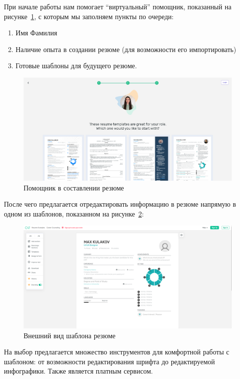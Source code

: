 \documentclass[master, och, pract]{SCWorks}
\begin{document}
При начале работы нам помогает “виртуальный” помощник, показанный на рисунке~\ref{fig:19}, 
с которым мы заполняем пункты по очереди:
\begin{enumerate}
    \item Имя Фамилия
    \item Наличие опыта в создании резюме (для возможности его импортировать)
    \item Готовые шаблоны для будущего резюме.
\end{enumerate}

\begin{figure}[!ht]
    \centering
    \includegraphics[width=12cm]{images/image16.png}
    \caption{\label{fig:19}%
        Помощник в составлении резюме}
\end{figure}

После чего предлагается отредактировать информацию в резюме напрямую в одном из шаблонов, 
показанном на рисунке~\ref{fig:20}:
\begin{figure}[!ht]
    \centering
    \includegraphics[width=12cm]{images/image20.png}
    \caption{\label{fig:20}%
        Внешний вид шаблона резюме}
\end{figure}

На выбор предлагается множество инструментов для комфортной работы с шаблоном: 
от возможности редактирования шрифта до редактируемой инфографики. 
Также является платным сервисом.
\end{document}
